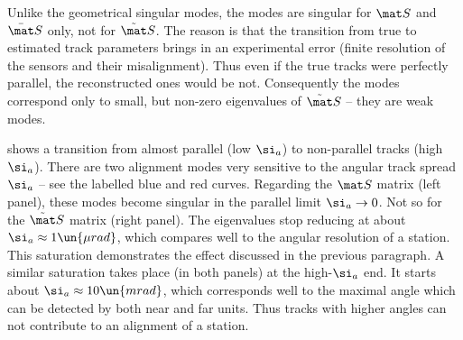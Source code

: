 

Unlike the geometrical singular modes, the modes  are singular for $\mat S$ and $\bar\mat S$ only, not for $\tilde\mat S$. The reason is that the transition  from true to estimated track parameters brings in an experimental error (finite resolution of the sensors and their misalignment). Thus even if the true tracks were perfectly parallel, the reconstructed ones would be not. Consequently the modes  correspond only to small, but non-zero eigenvalues of $\tilde\mat S$ -- they are weak modes.

 shows a transition from almost parallel (low $\si_a$) to non-parallel tracks (high $\si_a$). There are two alignment modes very sensitive to the angular track spread $\si_a$ -- see the labelled blue and red curves. Regarding the $\mat S$ matrix (left panel), these modes become singular in the parallel limit $\si_a \to 0$. Not so for the $\tilde\mat S$ matrix (right panel). The eigenvalues stop reducing at about $\si_a\approx 1\un{\mu rad}$, which compares well to the angular resolution of a station. This saturation demonstrates the effect discussed in the previous paragraph. A similar saturation takes place (in both panels) at the high-$\si_a$ end. It starts about $\si_a \approx 10\un{mrad}$, which corresponds well to the maximal angle which can be detected by both near and far units. Thus tracks with higher angles can not contribute to an alignment of a station.


